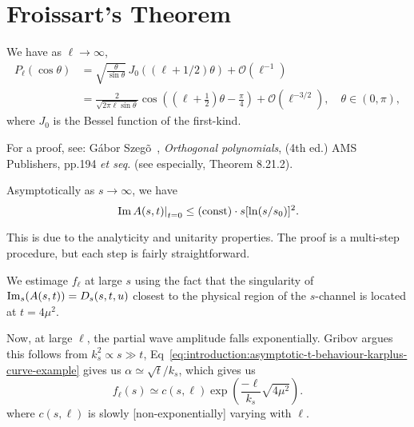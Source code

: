 

\section{Froissart's Theorem}

\begin{lemma}
We have as $\ell\to\infty$,
\begin{subequations}
  \begin{align}
  P_\ell (\cos \theta) &= \sqrt{\frac{\theta}{\sin \theta}} \, J_0((\ell+1/2)\theta) + \mathcal{O}\left(\ell^{-1}\right) \\
&= \frac{2}{\sqrt{2\pi \ell\sin\theta}}\cos\left(\left(\ell + \tfrac12\right)\theta - \frac{\pi}{4}\right) + \mathcal{O}\left(\ell^{-3/2}\right), \quad \theta \in (0,\pi),
\end{align}
\end{subequations}
where $J_{0}$ is the Bessel function of the first-kind.
\end{lemma}

For a proof, see:
G\'abor Szeg\~o~\cite{szego},
\emph{Orthogonal polynomials}, (4th ed.) AMS Publishers, pp.194
\emph{et seq.} (see especially, Theorem 8.21.2).

\begin{theorem}[Froissart]\label{thm:froissart-bound}
  Asymptotically as $s\to\infty$, we have
  \begin{equation}
\left.\operatorname{Im}A(s,t)\right|_{t=0}\leq(\mbox{const})\cdot s[\ln(s/s_{0})]^{2}.
  \end{equation}
\end{theorem}

This is due to the analyticity and unitarity properties. The proof is a
multi-step procedure, but each step is fairly straightforward.

We estimage $f_{\ell}$ at large $s$ using the fact that the singularity
of $\operatorname{Im}_{s}(A(s,t))=D_{s}(s,t,u)$ closest to the physical
region of the $s$-channel is located at $t=4\mu^{2}$.

Now, at large $\ell$, the partial wave amplitude falls exponentially.
Gribov argues this follows from $k_{s}^{2}\propto s\gg t$, Eq~\eqref{eq:introduction:asymptotic-t-behaviour-karplus-curve-example}
gives us $\alpha\simeq\sqrt{t}/k_{s}$, which gives us 
\begin{equation}\label{eq:intro:froissart-thm:step-1}
f_{\ell}(s)\simeq c(s,\ell)\exp\left(\frac{-\ell}{k_{s}}\sqrt{4\mu^{2}}\right).
\end{equation}
where $c(s,\ell)$ is slowly [non-exponentially] varying with $\ell$.

